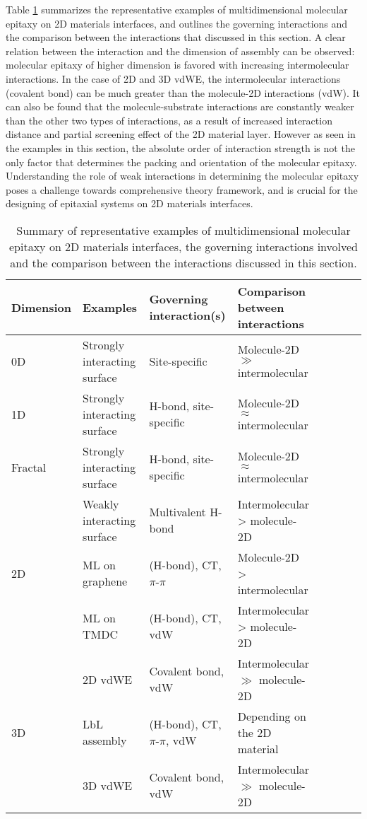 Table \ref{tbl-summary-multidimension} summarizes the representative
examples of multidimensional molecular epitaxy on 2D materials
interfaces, and outlines the governing interactions and the comparison
between the interactions that discussed in this section. A clear
relation between the interaction and the dimension of assembly can be
observed: molecular epitaxy of higher dimension is favored with
increasing intermolecular interactions. In the case of 2D and 3D vdWE,
the intermolecular interactions (covalent bond) can be much greater
than the molecule-2D interactions (vdW). It can also be found that the
molecule-substrate interactions are constantly weaker than the other
two types of interactions, as a result of increased interaction
distance and partial screening effect of the 2D material
layer. However as seen in the examples in this section, the absolute
order of interaction strength is not the only factor that determines
the packing and orientation of the molecular epitaxy. Understanding
the role of weak interactions in determining the molecular epitaxy
poses a challenge towards comprehensive theory framework, and is
crucial for the designing of epitaxial systems on 2D materials
interfaces.

\begin{table}[htbp]
\caption{\label{tbl-summary-multidimension}
Summary of representative examples of multidimensional molecular epitaxy on 2D materials interfaces, the governing interactions involved and the comparison between the interactions discussed in this section.}
\centering
\begin{tabularx}{0.95\textwidth}{lp{3cm}lp{4cm}lp{4cm}lp{5cm}}
\hline
Dimension & Examples & Governing interaction(s) & Comparison between interactions\\
\hline
0D & Strongly interacting surface & Site-specific & Molecule-2D \(\gg\) intermolecular\\
\hline
1D & Strongly interacting surface & H-bond,  site-specific & Molecule-2D \(\approx\) intermolecular\\
\hline
Fractal & Strongly interacting surface & H-bond, site-specific & Molecule-2D \(\approx\) intermolecular\\
 & Weakly interacting surface & Multivalent H-bond & Intermolecular  \textgreater{} molecule-2D\\
\hline
2D & ML on graphene & (H-bond), CT, \(\pi\)-\(\pi\) & Molecule-2D > intermolecular\\
 & ML on TMDC & (H-bond), CT, vdW & Intermolecular  \textgreater{} molecule-2D\\
 & 2D vdWE & Covalent bond,   vdW & Intermolecular  \(\gg\)  molecule-2D\\
\hline
3D & LbL assembly & (H-bond), CT, \(\pi\)-\(\pi\), vdW & Depending on the 2D material\\
 & 3D vdWE & Covalent bond,   vdW & Intermolecular \(\gg\) molecule-2D\\
\hline
\end{tabularx}
\end{table}




